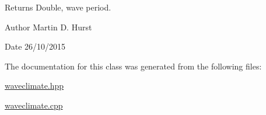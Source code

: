 \begin{DoxyReturn}{Returns}
Double, wave period. 
\end{DoxyReturn}
\begin{DoxyAuthor}{Author}
Martin D. Hurst 
\end{DoxyAuthor}
\begin{DoxyDate}{Date}
26/10/2015 
\end{DoxyDate}


The documentation for this class was generated from the following files\-:\begin{DoxyCompactItemize}
\item 
\hyperlink{waveclimate_8hpp}{waveclimate.\-hpp}\item 
\hyperlink{waveclimate_8cpp}{waveclimate.\-cpp}\end{DoxyCompactItemize}
